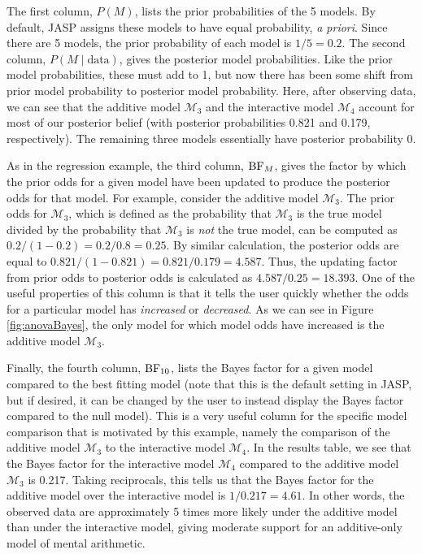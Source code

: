 \documentclass[english,,doc,floatsintext]{apa6}
\begin{document}
The first column, \(P(M)\), lists the prior probabilities of the 5 models. By default, JASP assigns these models to have equal probability, \emph{a priori}. Since there are 5 models, the prior probability of each model is \(1/5 = 0.2\). The second column, \(P(M\mid \text{data})\), gives the posterior model probabilities. Like the prior model probabilities, these must add to 1, but now there has been some shift from prior model probability to posterior model probability. Here, after observing data, we can see that the additive model \(\mathcal{M}_3\) and the interactive model \(\mathcal{M}_4\) account for most of our posterior belief (with posterior probabilities 0.821 and 0.179, respectively). The remaining three models essentially have posterior probability 0.

As in the regression example, the third column, \(\textnormal{BF}_{M}\), gives the factor by which the prior odds for a given model have been updated to produce the posterior odds for that model. For example, consider the additive model \(\mathcal{M}_3\). The prior odds for \(\mathcal{M}_3\), which is defined as the probability that \(\mathcal{M}_3\) is the true model divided by the probability that \(\mathcal{M}_3\) is \emph{not} the true model, can be computed as \(0.2/(1-0.2) = 0.2/0.8 = 0.25\). By similar calculation, the posterior odds are equal to \(0.821/(1-0.821) = 0.821/0.179 = 4.587\). Thus, the updating factor from prior odds to posterior odds is calculated as \(4.587/0.25 = 18.393\). One of the useful properties of this column is that it tells the user quickly whether the odds for a particular model has \emph{increased} or \emph{decreased}. As we can see in Figure \ref{fig:anovaBayes}, the only model for which model odds have increased is the additive model \(\mathcal{M}_3\).

Finally, the fourth column, \(\textnormal{BF}_{10}\), lists the Bayes factor for a given model compared to the best fitting model (note that this is the default setting in JASP, but if desired, it can be changed by the user to instead display the Bayes factor compared to the null model). This is a very useful column for the specific model comparison that is motivated by this example, namely the comparison of the additive model \(\mathcal{M}_3\) to the interactive model \(\mathcal{M}_4\). In the results table, we see that the Bayes factor for the interactive model \(\mathcal{M}_4\) compared to the additive model \(\mathcal{M}_3\) is 0.217. Taking reciprocals, this tells us that the Bayes factor for the additive model over the interactive model is \(1/0.217 = 4.61\). In other words, the observed data are approximately 5 times more likely under the additive model than under the interactive model, giving moderate support for an additive-only model of mental arithmetic.
\end{document}
